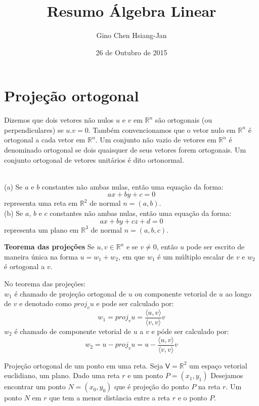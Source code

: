 \documentclass[10pt,a4paper]{article}
\author{Gino Chen Hsiang-Jan}
\title{Resumo Álgebra Linear}
\date{26 de Outubro de 2015}
\begin{document}
\maketitle
\tableofcontents

\newpage

\section{Projeção ortogonal}
\begin{definition}
Dizemos que dois vetores não nulos $u$ e $v$ em $\mathbb{R}^n$ são ortogonais (ou perpendiculares) se $u.v = 0$. Também convencionamos que o vetor nulo em $\mathbb{R}^n$ é ortogonal a cada vetor em $\mathbb{R}^n$. Um conjunto não vazio de vetores em $\mathbb{R}^n$ é denominado ortogonal se dois quaisquer de seus vetores forem ortogonais. Um conjunto ortogonal de vetores unitários é dito ortonormal.
\end{definition}

\begin{theorem}\\

(a) Se $a$ e $b$ constantes não ambas nulas, então uma equação da forma:\\
\[
	a x + b y + c = 0
\]
representa uma reta em $\mathbb{R}^2$ de normal $n = (a, b)$.\\

(b) Se $a$, $b$ e $c$ constantes não ambas nulas, então uma equação da forma:
\[
	a x + b y + c z + d = 0
\]
representa um plano em $\mathbb{R}^3$ de normal $n = (a, b, c)$.
\end{theorem}

\begin{theorem} \textbf{Teorema das projeções} Se $u, v \in \mathbb{R}^n$ e se $v \neq 0$, então $u$ pode ser escrito de maneira única na forma $u = w_1 + w_2$, em que $w_1$ é um múltiplo escalar de $v$ e $w_2$ é ortogonal a $v$.
\end{theorem}

\begin{definition} No teorema das projeções:\\
	$w_1$ é chamado de projeção ortogonal de $u$ ou componente vetorial de $u$ ao longo de $v$ e denotado como $proj_v u$ e pode ser calculado por: 
	\[
		w_1 = proj_v u = \frac{\langle u, v \rangle}{\langle v, v \rangle} v
	\]
	$w_2$ é chamado de componente vetorial de $u$ a $v$ e póde ser calculado por:
	\[
		w_2 = u - proj_v u = u - \frac{\langle u, v \rangle}{\langle v, v \rangle} v
	\]
\end{definition}
Projeção ortogonal de um ponto em uma reta.
Seja $\mathsf{V} = \mathbb{R}^2$ um espaço vetorial euclidiano, um plano. Dado uma reta $r$ e um ponto $P = (x_1, y_1)$ Desejamos encontrar um ponto $N = (x_0, y_0)$ que é projeção do ponto $P$ na reta $r$. Um ponto $N$ em $r$ que tem a menor distância entre a reta $r$ e o ponto $P$.\\
\end{document}
